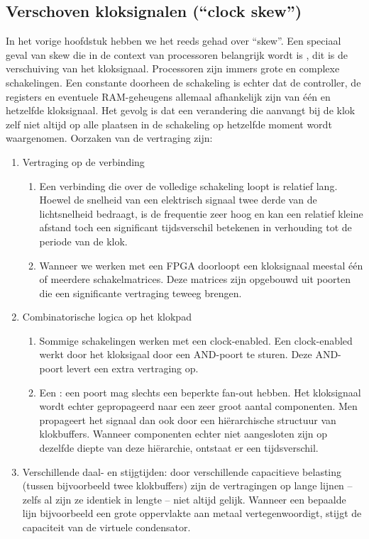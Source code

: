 \subsection{Verschoven kloksignalen (``clock skew'')}
In het vorige hoofdstuk hebben we het reeds gehad over ``skew''. Een speciaal geval van skew die in de context van processoren belangrijk wordt is , dit is de verschuiving van het kloksignaal. Processoren zijn immers grote en complexe schakelingen. Een constante doorheen de schakeling is echter dat de controller, de registers en eventuele RAM-geheugens allemaal afhankelijk zijn van \'e\'en en hetzelfde kloksignaal. Het gevolg is dat een verandering die aanvangt bij de klok zelf niet altijd op alle plaatsen in de schakeling op hetzelfde moment wordt waargenomen. Oorzaken van de vertraging zijn:
\begin{enumerate}
 \item Vertraging op de verbinding
 \begin{enumerate}
  \item Een verbinding die over de volledige schakeling loopt is relatief lang. Hoewel de snelheid van een elektrisch signaal twee derde van de lichtsnelheid bedraagt, is de frequentie zeer hoog en kan een relatief kleine afstand toch een significant tijdsverschil betekenen in verhouding tot de periode van de klok.
  \item Wanneer we werken met een FPGA doorloopt een kloksignaal meestal \'e\'en of meerdere schakelmatrices. Deze matrices zijn opgebouwd uit poorten die een significante vertraging teweeg brengen.
 \end{enumerate}
 \item Combinatorische logica op het klokpad
 \begin{enumerate}
  \item Sommige schakelingen werken met een clock-enabled. Een clock-enabled werkt door het kloksigaal door een AND-poort te sturen. Deze AND-poort levert een extra vertraging op.
  \item Een : een poort mag slechts een beperkte fan-out hebben. Het kloksignaal wordt echter gepropageerd naar een zeer groot aantal componenten. Men propageert het signaal dan ook door een hi\"erarchische structuur van klokbuffers. Wanneer componenten echter niet aangesloten zijn op dezelfde diepte van deze hi\"erarchie, ontstaat er een tijdsverschil.
 \end{enumerate}
 \item Verschillende daal- en stijgtijden: door verschillende capacitieve belasting (tussen bijvoorbeeld twee klokbuffers) zijn de vertragingen op lange lijnen -- zelfs al zijn ze identiek in lengte -- niet altijd gelijk. Wanneer een bepaalde lijn bijvoorbeeld een grote oppervlakte aan metaal vertegenwoordigt, stijgt de capaciteit van de virtuele condensator.
\end{enumerate}
